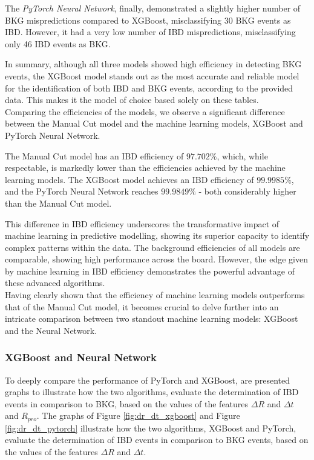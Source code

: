 The \textit{PyTorch Neural Network}, finally, demonstrated a slightly higher number of BKG mispredictions compared to XGBoost, misclassifying 30 BKG events as IBD. However, it had a very low number of IBD mispredictions, misclassifying only 46 IBD events as BKG.

In summary, although all three models showed high efficiency in detecting BKG events, the XGBoost model stands out as the most accurate and reliable model for the identification of both IBD and BKG events, according to the provided data. This makes it the model of choice based solely on these tables.\\


Comparing the efficiencies of the models, we observe a significant difference between the Manual Cut model and the machine learning models, XGBoost and PyTorch Neural Network.

The Manual Cut model has an IBD efficiency of $97.702\%$, which, while respectable, is markedly lower than the efficiencies achieved by the machine learning models. The XGBoost model achieves an IBD efficiency of $99.9985\%$, and the PyTorch Neural Network reaches $99.9849\%$ - both considerably higher than the Manual Cut model.

This difference in IBD efficiency underscores the transformative impact of machine learning in predictive modelling, showing its superior capacity to identify complex patterns within the data. The background efficiencies of all models are comparable, showing high performance across the board. However, the edge given by machine learning in IBD efficiency demonstrates the powerful advantage of these advanced algorithms.\\

Having clearly shown that the efficiency of machine learning models outperforms that of the Manual Cut model, it becomes crucial to delve further into an intricate comparison between two standout machine learning models: XGBoost and the Neural Network.



\subsubsection{XGBoost and Neural Network}
To deeply compare the performance of PyTorch and XGBoost, are presented graphs to illustrate how the two algorithms, evaluate the determination of IBD events in comparison to BKG, based on the values of the features $\Delta R$ and $\Delta t$ and $R_{pro}$.
The graphs of Figure \ref{fig:dr_dt_xgboost} and  Figure \ref{fig:dr_dt_pytorch} illustrate how the two algorithms, XGBoost and PyTorch, evaluate the determination of IBD events in comparison to BKG events, based on the values of the features $\Delta R$ and $\Delta t$.\\


